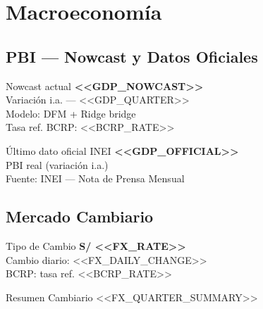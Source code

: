 \documentclass[10pt,a4paper]{article}
\newcommand{\kpivalue}[1]{%
  {\fontsize{16}{18}\selectfont\bfseries\color{ink}#1}%
}
\newcommand{\kpilabel}[1]{%
  {\small\color{ink3}#1}%
}
\begin{document}
\vspace{0.8em}

\section{Macroeconomía}

\subsection{PBI — Nowcast y Datos Oficiales}

\noindent
\begin{minipage}[t]{0.49\textwidth}
  \begin{sectionbox}{Nowcast actual}
    \kpivalue{<<GDP_NOWCAST>>}\\[4pt]
    \kpilabel{Variación i.a. — <<GDP_QUARTER>>}\\[8pt]
    \kpilabel{Modelo: DFM + Ridge bridge}\\
    \kpilabel{Tasa ref. BCRP: <<BCRP_RATE>>}
  \end{sectionbox}
\end{minipage}%
\hfill
\begin{minipage}[t]{0.49\textwidth}
  \begin{sectionbox}{Último dato oficial INEI}
    \kpivalue{<<GDP_OFFICIAL>>}\\[4pt]
    \kpilabel{PBI real (variación i.a.)}\\[8pt]
    \kpilabel{Fuente: INEI — Nota de Prensa Mensual}
  \end{sectionbox}
\end{minipage}

\vspace{0.8em}

\subsection{Mercado Cambiario}

\noindent
\begin{minipage}[t]{0.49\textwidth}
  \begin{kpibox}{Tipo de Cambio}
    \kpivalue{S/ <<FX_RATE>>}\\[2pt]
    \kpilabel{Cambio diario: <<FX_DAILY_CHANGE>>}\\[4pt]
    \kpilabel{BCRP: tasa ref. <<BCRP_RATE>>}
  \end{kpibox}
\end{minipage}%
\hfill
\begin{minipage}[t]{0.49\textwidth}
  \begin{kpibox}{Resumen Cambiario}
    \small\color{ink}<<FX_QUARTER_SUMMARY>>
  \end{kpibox}
\end{minipage}
\end{document}
